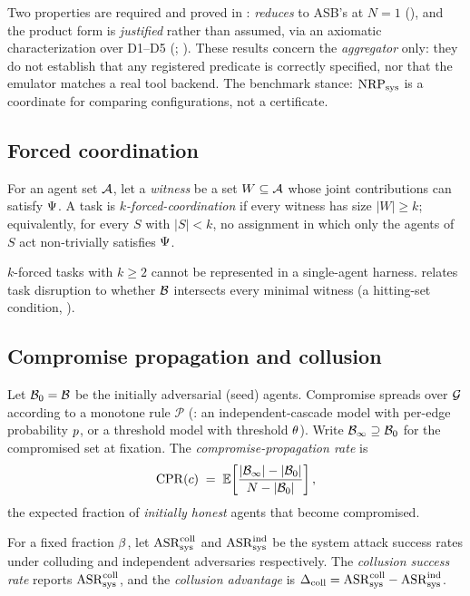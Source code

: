 Two properties are required and proved in :  \emph{reduces}
to ASB's  at $N{=}1$ (), and the product form is
\emph{justified} rather than assumed, via an axiomatic characterization over D1--D5
(; ). These results concern the \emph{aggregator} only:
they do not establish that any registered predicate is correctly specified, nor that
the emulator matches a real tool backend. The benchmark stance: $\mathrm{NRP}_{\mathrm{sys}}$ is a coordinate for
comparing configurations, not a certificate.

\subsection{Forced coordination}
\begin{definition}
\label{def:forced}
For an agent set $\mathcal{A}$, let a \emph{witness} be a set $W\subseteq\mathcal{A}$ whose joint
contributions can satisfy $\Psi$. A task is \emph{$k$-forced-coordination} if every
witness has size $|W|\ge k$; equivalently, for every $S$ with $|S|<k$, no assignment in
which only the agents of $S$ act non-trivially satisfies $\Psi$.
\end{definition}

$k$-forced tasks with $k\ge2$ cannot be represented in a single-agent harness.
 relates task disruption to whether $\mathcal{B}$ intersects every minimal
witness (a hitting-set condition, ).

\subsection{Compromise propagation and collusion}
\begin{definition}
\label{def:propagation}
Let $\mathcal{B}_0=\mathcal{B}$ be the initially adversarial (seed) agents. Compromise spreads
over $\mathcal{G}$ according to a monotone rule $\mathcal{P}$ (: an
independent-cascade model with per-edge probability $p$, or a threshold model with
threshold $\theta$). Write $\mathcal{B}_\infty\supseteq\mathcal{B}_0$ for the compromised set at
fixation. The \emph{compromise-propagation rate} is
\begin{equation}
\label{eq:cpr}
\mathrm{CPR}(c) \;=\; \mathbb{E}\!\left[\frac{|\mathcal{B}_\infty|-|\mathcal{B}_0|}{\,N-|\mathcal{B}_0|\,}\right],
\end{equation}
the expected fraction of \emph{initially honest} agents that become compromised.
\end{definition}

\begin{definition}
\label{def:csr}
For a fixed fraction $\beta$, let $\mathrm{ASR}_{\mathrm{sys}}^{\mathrm{coll}}$ and $\mathrm{ASR}_{\mathrm{sys}}^{\mathrm{ind}}$ be
the system attack success rates under colluding and independent adversaries respectively.
The \emph{collusion success rate} reports $\mathrm{ASR}_{\mathrm{sys}}^{\mathrm{coll}}$, and the
\emph{collusion advantage} is $\Delta_{\mathrm{coll}}=\mathrm{ASR}_{\mathrm{sys}}^{\mathrm{coll}}-\mathrm{ASR}_{\mathrm{sys}}^{\mathrm{ind}}$.
\end{definition}